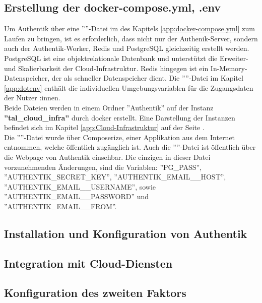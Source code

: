 \subsection{Erstellung der docker-compose.yml, .env}
\label{sec:Erstellung der docker-compose.yml, .env}
Um Authentik über eine ''''-Datei im  des Kapitels \ref{app:docker-compose.yml} 
zum Laufen zu bringen, ist es erforderlich, dass nicht nur der Authenik-Server, sondern auch der Authentik-Worker, 
Redis und PostgreSQL gleichzeitig erstellt werden. PostgreSQL ist eine objektrelationale Datenbank und unterstützt 
die Erweiter- und Skalierbarkeit der Cloud-Infrastruktur. Redis hingegen ist ein In-Memory-Datenspeicher, der als 
schneller Datenspeicher dient. Die ''''-Datei im Kapitel \ref{app:dotenv}  
enthält die individuellen Umgebungsvariablen für die Zugangsdaten der Nutzer :innen. 
\\Beide Dateien werden in einem Ordner ''Authentik'' auf der Instanz \textbf{''tal\_cloud\_infra''} durch docker erstellt. 
Eine Darstellung der Instanzen befindet sich im Kapitel \ref{app:Cloud-Infrastruktur}   auf der Seite 
\pageref{app:Cloud-Infrastruktur}.
\\Die ''''-Datei wurde über Composerize, einer Applikation aus dem Internet entnommen, welche öffentlich 
zugänglich ist. Auch die ''''-Datei ist öffentlich über die Webpage von Authentik einsehbar. Die einzigen in dieser 
Datei vorzunehmenden Änderungen, sind die Variablen: ''PG\_PASS'', ''AUTHENTIK\_SECRET\_KEY'', ''AUTHENTIK\_EMAIL\_\_HOST'', 
''AUTHENTIK\_EMAIL\_\_USERNAME'', sowie ''AUTHENTIK\_EMAIL\_\_PASSWORD'' und ''AUTHENTIK\_EMAIL\_\_FROM''. 

\subsection{Installation und Konfiguration von Authentik}
\label{sec:Installation und Konfiguration von Authentik}


\subsection{Integration mit Cloud-Diensten}
\label{sec:Integration mit Cloud-Diensten}

\subsection{Konfiguration des zweiten Faktors}
\label{sec:Konfiguration des zweiten Faktors}